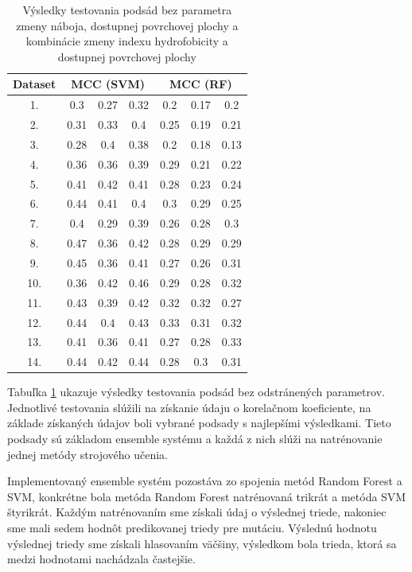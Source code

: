 \begin{table}[H]
	\centering
\begin{tabular}{|c |c |c |c |c |c |c|}
	\hline
Dataset & \multicolumn{3}{c|}{MCC (SVM)} & \multicolumn{3}{c|}{MCC (RF)} \\ \cline{1-7}
\hline 
1. & 0.3 & 0.27 & 0.32 & 0.2 & 0.17 & 0.2 \\ \cline{1-7} 
2. & 0.31 & 0.33 & 0.4 & 0.25 & 0.19 & 0.21\\ \cline{1-7} 
3. & 0.28 & 0.4 & 0.38 & 0.2 & 0.18 & 0.13 \\ \cline{1-7}
4. & 0.36 & 0.36 & 0.39 & 0.29 & 0.21 & 0.22 \\ \cline{1-7}
5. & 0.41 & 0.42 & 0.41 & 0.28 & 0.23 & 0.24\\ \cline{1-7}
6. & 0.44 & 0.41 & 0.4 & 0.3 & 0.29 & 0.25\\ \cline{1-7}
7. & 0.4 & 0.29 & 0.39 & 0.26 & 0.28 & 0.3\\ \cline{1-7}
8. & 0.47 & 0.36 & 0.42 & 0.28 & 0.29 & 0.29\\ \cline{1-7}
9. & 0.45 & 0.36 & 0.41 & 0.27 & 0.26 & 0.31\\ \cline{1-7}
10.& 0.36 & 0.42 & 0.46 & 0.29 & 0.28 & 0.32\\ \cline{1-7}
11.& 0.43 & 0.39 & 0.42 & 0.32 & 0.32 & 0.27\\ \cline{1-7}
12.& 0.44 & 0.4 & 0.43  & 0.33 & 0.31 & 0.32\\ \cline{1-7}
13.& 0.41 & 0.36  & 0.41 & 0.27 & 0.28 & 0.33\\ \cline{1-7}
14.& 0.44 & 0.42 & 0.44 & 0.28 & 0.3 &  0.31\\ \cline{1-7}
\hline
\end{tabular}
\caption {Výsledky testovania podsád bez parametra zmeny náboja, dostupnej povrchovej plochy a kombinácie zmeny indexu hydrofobicity a dostupnej povrchovej plochy} \label{pythontest1} 
\end{table}


Tabuľka \ref{pythontest1}  ukazuje výsledky testovania podsád bez odstránených parametrov. Jednotlivé testovania slúžili na získanie údaju o korelačnom koeficiente, na základe získaných údajov boli vybrané podsady s najlepšími výsledkami. Tieto podsady sú základom ensemble systému a každá z nich slúži na natrénovanie jednej metódy strojového učenia.

Implementovaný ensemble systém pozostáva zo spojenia metód Random Forest a SVM, konkrétne bola metóda Random Forest natrénovaná trikrát a metóda SVM štyrikrát. Každým natrénovaním sme získali údaj o výslednej triede, nakoniec sme mali sedem hodnôt predikovanej triedy pre mutáciu. Výslednú hodnotu výslednej triedy sme získali hlasovaním väčšiny, výsledkom bola trieda, ktorá sa medzi hodnotami nachádzala častejšie.

